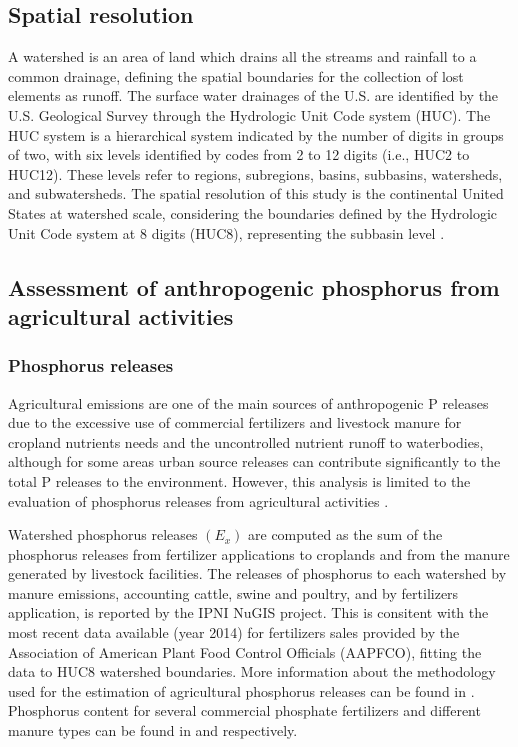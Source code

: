\documentclass[10pt,a4paper]{article}
\begin{document}
\subsection{Spatial resolution}
A watershed is an area of land which drains all the streams and rainfall to a common drainage, defining the spatial boundaries for the collection of lost elements as runoff. The surface  water  drainages of the U.S. are identified by the U.S. Geological Survey through the Hydrologic Unit Code system (HUC). The HUC system is a hierarchical system indicated by the number of digits in groups of two, with six levels identified by codes from 2 to 12 digits (i.e., HUC2 to HUC12). These levels refer to regions, subregions, basins, subbasins, watersheds, and subwatersheds. The spatial resolution of this study is the continental United States at watershed scale, considering the boundaries defined by the Hydrologic Unit Code system at 8 digits (HUC8), representing the subbasin level .

\subsection{Assessment of anthropogenic phosphorus from agricultural activities}
\subsubsection{Phosphorus releases} \label{Preleases}
Agricultural emissions are one of the main sources of anthropogenic P releases due to the excessive use of commercial fertilizers and livestock manure for cropland nutrients needs and the uncontrolled nutrient runoff to waterbodies, although for some areas urban source releases can contribute significantly to the total P releases to the environment. However, this analysis is limited to the evaluation of phosphorus releases from agricultural activities .

Watershed phosphorus releases $\left(E_{x}\right)$ are computed as the sum of the phosphorus releases from fertilizer applications to croplands and from the manure generated by livestock facilities. The releases of phosphorus to each watershed by manure emissions, accounting cattle, swine and poultry, and by fertilizers application, is reported by the IPNI NuGIS project. This is consitent with the most recent data available (year 2014) for fertilizers sales provided by the Association of American Plant Food Control Officials (AAPFCO), fitting the data to HUC8 watershed boundaries. More information about the methodology used for the estimation of agricultural phosphorus releases can be found in . Phosphorus content for several commercial phosphate fertilizers and different manure types can be found in  and  respectively.
\end{document}
